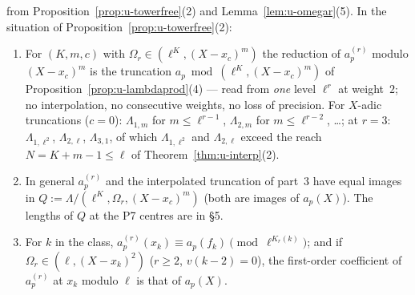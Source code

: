 \documentclass[11pt]{article}
\newcommand{\Iw}{\Lambda}                         %
\newcommand{\Om}[1]{\Omega_{#1}}                      %
\begin{document}
\begin{corollary}\label{cor:u-towertrunc}
\PROVED{} from Proposition~\ref{prop:u-towerfree}(2) and Lemma~\ref{lem:u-omegar}(5). In the situation of Proposition~\ref{prop:u-towerfree}(2):
\begin{enumerate}
\item For $(K,m,c)$ with $\Om r\in(\ell^{K},(X-x_c)^{m})$ the reduction of $a^{(r)}_p$ modulo $(X-x_c)^{m}$ is the truncation $a_p\bmod(\ell^{K},(X-x_c)^{m})$ of
  Proposition~\ref{prop:u-lambdaprod}(4) --- read from \emph{one} level $\ell^{r}$ at weight~$2$; no interpolation, no consecutive weights, no loss of precision. For $X$-adic truncations
  ($c=0$): $\Iw_{1,m}$ for $m\le\ell^{r-1}$, $\Iw_{2,m}$ for $m\le\ell^{r-2}$, \dots; at $r=3$: $\Iw_{1,\ell^{2}}$, $\Iw_{2,\ell}$, $\Iw_{3,1}$, of which $\Iw_{1,\ell^{2}}$ and $\Iw_{2,\ell}$ exceed the reach
  $N=K+m-1\le\ell$ of Theorem~\ref{thm:u-interp}(2).
\item In general $a^{(r)}_p$ and the interpolated truncation of part~3 have equal images in $Q:=\Iw/(\ell^{K},\Om r,(X-x_c)^{m})$ (both are images of $a_p(X)$). The lengths of $Q$ at the P7 centres
  are in  \S5.
\item For $k$ in the class, $a^{(r)}_p(x_k)\equiv a_p(f_k)\pmod{\ell^{K_r(k)}}$; and if $\Om r\in(\ell,(X-x_{k})^{2})$ ($r\ge2$, $v(k-2)=0$), the first-order coefficient of $a^{(r)}_p$ at $x_k$ modulo
  $\ell$ is that of $a_p(X)$.
\end{enumerate}
\end{corollary}
\end{document}
